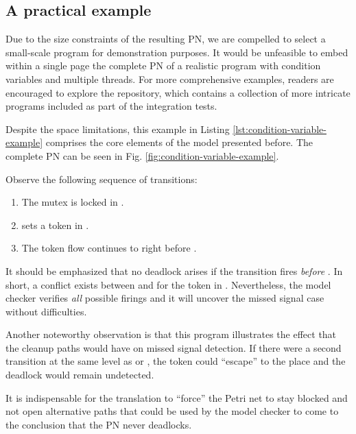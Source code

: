 \subsection{A practical example}

Due to the size constraints of the resulting \acrshort{PN},
we are compelled to select a small-scale program for demonstration purposes.
It would be unfeasible to embed within a single page
the complete \acrshort{PN} of a realistic program with condition variables and multiple threads.
For more comprehensive examples, readers are encouraged to explore the repository,
which contains a collection of more intricate programs included as part of the integration tests.

Despite the space limitations, this example in Listing \ref{lst:condition-variable-example}
comprises the core elements of the model presented before.
The complete \acrshort{PN} can be seen in Fig. \ref{fig:condition-variable-example}.

Observe the following sequence of transitions:

\begin{enumerate}
      \item The mutex is locked in .
      \item {} sets a token in .
      \item The token flow continues to  right before .
\end{enumerate}

It should be emphasized that no deadlock arises
if the transition  fires
\emph{before} .
In short, a conflict exists between 
and  for the token in .
Nevertheless, the model checker verifies \emph{all} possible firings
and it will uncover the missed signal case without difficulties.

Another noteworthy observation is that this program illustrates
the effect that the cleanup paths would have on missed signal detection.
If there were a second transition
at the same level as  or ,
the token could ``escape'' to the  place and the deadlock would remain undetected.

It is indispensable for the translation to ``force'' the Petri net to stay blocked
and not open alternative paths that could be used by the model checker
to come to the conclusion that the \acrshort{PN} never deadlocks.

